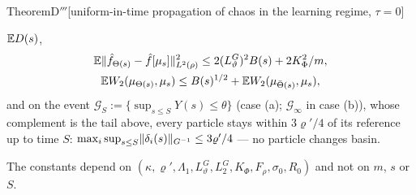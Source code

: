 \begin{thm}{Theorem}{D$'''$}[uniform-in-time propagation of chaos in the learning regime, $\tau = 0$]
\begin{enumerate}[label=\textup{(\alph*)}]
    $\mathbb{E} D(s)$,
    \begin{gather*}
      \mathbb{E}\lVert \hat f_{\Theta(s)} - \hat f[\mu_s]\rVert^2_{L^2(\rho)}\le2(L_\vartheta^G)^2B(s) + 2K_\Phi^2/m,\\
      \mathbb{E} W_2(\mu_{\Theta(s)},\mu_s)\le B(s)^{1/2} + \mathbb{E} W_2(\mu_{\bar\Theta(s)},\mu_s),
    \end{gather*}
    and on the event $\mathcal{G}_S := \{\sup_{s\le S}Y(s)\le\theta\}$ (case \textup{(a)}; $\mathcal{G}_\infty$ in
    case \textup{(b)}), whose complement is the tail above, every particle stays within $3\varrho'/4$ of its reference
    up to time $S$: $\max_i\sup_{s\le S}\lVert \delta_i(s)\rVert_{G^{-1}}\le3\varrho'/4$ --- no particle changes basin.
\end{enumerate}
The constants depend on $(\kappa,\varrho',\Lambda_1,L_\vartheta^G,L_2^G,K_\Phi,F_\rho,\sigma_0,R_0)$ and not on $m$,
$s$ or $S$.
\end{thm}

